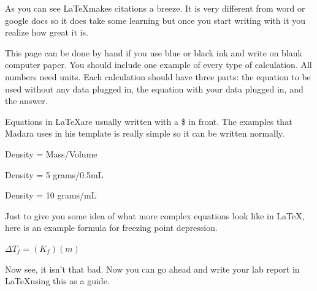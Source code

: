 \documentclass{report}
\begin{document}
\printbibliography
\begin{flushleft}
\hspace{6ex}As you can see \LaTeX  makes citations a breeze. It is very different from word or google docs so it does take some learning but once you start writing with it you realize how great it is.
\end{flushleft}
\newpage 
\begin{flushleft}
This page can be done by hand if you use blue or black ink and write on blank computer paper. You should include one example of every type of calculation. All numbers need units. Each calculation should have three parts: the equation to be used without any data plugged in, the equation with your data plugged in, and the answer.
\end{flushleft}
\begin{flushleft}
\hspace{6ex}Equations in \LaTeX are usually written with a \$ in front. The examples that Madara uses in his template is really simple so it can be written normally.
\end{flushleft}
\begin{flushleft}
Density = Mass/Volume \hfill

Density = 5 grams/0.5mL \hfill

Density = 10 grams/mL \hfill

\end{flushleft}
\begin{flushleft}
Just to give you some idea of what more complex equations look like in \LaTeX, here is an example formula for freezing point depression.
\end{flushleft}
\begin{flushleft} 
$\Delta T_{f}=(K_{f})(m)$ 
\end{flushleft}
\begin{flushleft} 
Now see, it isn't that bad. Now you can go ahead and write your lab report in \LaTeX using this as a guide.
\end{flushleft}
\end{document}
